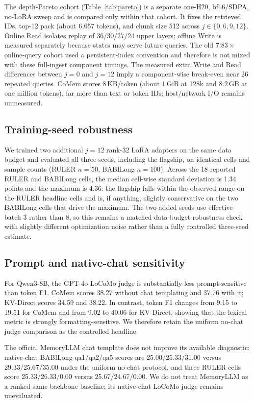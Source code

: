 The depth-Pareto cohort (Table~\ref{tab:pareto}) is a separate one-H20,
bf16/SDPA, no-LoRA sweep and is compared only within that cohort. It fixes the
retrieved IDs, top-12 pack (about 6,657 tokens), and chunk size 512 across
$j\in\{0,6,9,12\}$. Online Read isolates replay of 36/30/27/24 upper layers;
offline Write is measured separately because states may serve future queries.
The old $7.83\times$ online-query cohort used a persistent-index convention and
therefore is not mixed with these full-ingest component timings. The measured
extra Write and Read differences between $j{=}0$ and $j{=}12$ imply a
component-wise break-even near 26 repeated queries. CoMem stores 8\,KB/token
(about 1\,GiB at 128k and 8.2\,GB at one million tokens), far more than text or
token IDs; host/network I/O remains unmeasured.

\subsection{Training-seed robustness}

We trained two additional $j{=}12$ rank-32 LoRA adapters on the same data budget
and evaluated all three seeds, including the flagship, on identical cells and
sample counts (RULER $n{=}50$, BABILong $n{=}100$). Across the 18 reported RULER
and BABILong cells, the median cell-wise standard deviation is 1.34 points and
the maximum is 4.36; the flagship falls within the observed range on the RULER
headline cells and is, if anything, slightly conservative on the two BABILong
cells that drive the maximum. The two added seeds use effective batch 3 rather
than 8, so this remains a matched-data-budget robustness check with slightly
different optimization noise rather than a fully controlled three-seed estimate.

\subsection{Prompt and native-chat sensitivity}

For Qwen3-8B, the GPT-4o LoCoMo judge is substantially less prompt-sensitive
than token F1. CoMem scores 38.27 without chat templating and 37.76 with it;
KV-Direct scores 34.59 and 38.22. In contrast, token F1 changes from 9.15 to
19.51 for CoMem and from 9.02 to 40.06 for KV-Direct, showing that the lexical
metric is strongly formatting-sensitive. We therefore retain the uniform
no-chat judge comparison as the controlled headline.

The official MemoryLLM chat template does not improve its available diagnostic:
native-chat BABILong qa1/qa2/qa5 scores are 25.00/25.33/31.00 versus
29.33/25.67/35.00 under the uniform no-chat protocol, and three RULER cells
score 25.33/26.33/0.00 versus 25.67/24.67/0.00. We do not treat MemoryLLM as a
ranked same-backbone baseline; its native-chat LoCoMo judge remains unevaluated.

